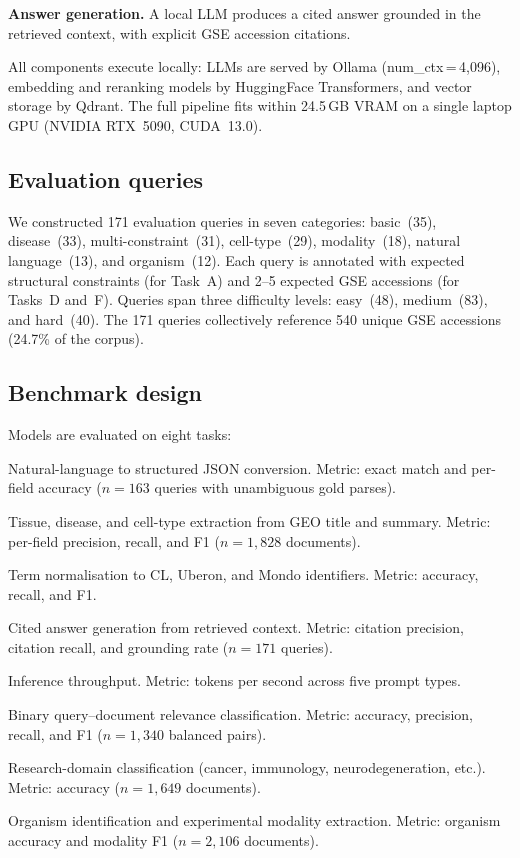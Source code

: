 \documentclass[sn-nature]{sn-jnl}
\begin{document}
\textbf{Answer generation.} A local LLM produces a cited answer grounded in
the retrieved context, with explicit GSE accession citations.

All components execute locally: LLMs are served by Ollama
(num\_ctx\,=\,4{,}096), embedding and reranking models by HuggingFace
Transformers, and vector storage by Qdrant. The full pipeline fits within
24.5\,GB VRAM on a single laptop GPU (NVIDIA RTX~5090, CUDA~13.0).

\subsection{Evaluation queries}\label{sec:queries}

We constructed 171 evaluation queries in seven categories: basic~(35),
disease~(33), multi-constraint~(31), cell-type~(29), modality~(18),
natural language~(13), and organism~(12). Each query is annotated with
expected structural constraints (for Task~A) and 2--5 expected GSE
accessions (for Tasks~D and~F). Queries span three difficulty levels:
easy~(48), medium~(83), and hard~(40). The 171 queries collectively
reference 540 unique GSE accessions (24.7\% of the corpus).

\subsection{Benchmark design}\label{sec:benchmark}

Models are evaluated on eight tasks:

\begin{description}[leftmargin=1.5em, itemsep=1pt]
  \item[Task A (Parse):] Natural-language to structured JSON conversion.
    Metric: exact match and per-field accuracy ($n = 163$ queries with
    unambiguous gold parses).
  \item[Task B (Extract):] Tissue, disease, and cell-type extraction from
    GEO title and summary. Metric: per-field precision, recall, and F1
    ($n = 1{,}828$ documents).
  \item[Task C (Ontology):] Term normalisation to CL, Uberon, and Mondo
    identifiers. Metric: accuracy, recall, and F1.
  \item[Task D (Answer):] Cited answer generation from retrieved context.
    Metric: citation precision, citation recall, and grounding rate
    ($n = 171$ queries).
  \item[Task E (Speed):] Inference throughput. Metric: tokens per second
    across five prompt types.
  \item[Task F (Relevance):] Binary query--document relevance classification.
    Metric: accuracy, precision, recall, and F1 ($n = 1{,}340$ balanced
    pairs).
  \item[Task G (Domain):] Research-domain classification (cancer,
    immunology, neurodegeneration, etc.). Metric: accuracy
    ($n = 1{,}649$ documents).
  \item[Task H (Organism + Modality):] Organism identification and
    experimental modality extraction. Metric: organism accuracy and modality
    F1 ($n = 2{,}106$ documents).
\end{description}
\end{document}
